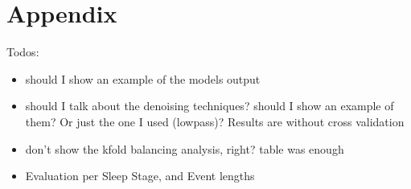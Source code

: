 \chapter{Appendix \label{Chapter-Appendix}}

Todos:
\begin{itemize}
    \item should I show an example of the models output %
    \item should I talk about the denoising techniques? should I show an example of them? Or just the one I used (lowpass)? Results are without cross validation %
    \item don't show the kfold balancing analysis, right? table was enough %
    \item Evaluation per Sleep Stage, and Event lengths %
\end{itemize}